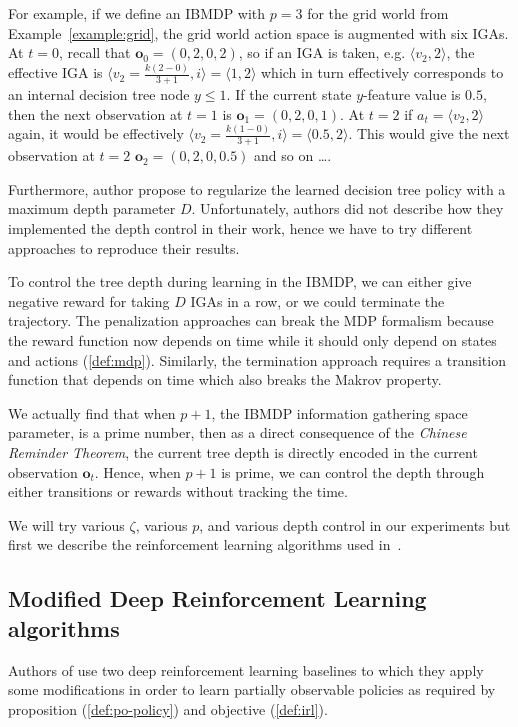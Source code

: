 For example, if we define an IBMDP with $p=3$ for the grid world from Example~\ref{example:grid}, the grid world action space is augmented with six IGAs. 
At $t=0$, recall that $\boldsymbol{o}_0=(0, 2, 0, 2)$, so if an IGA is taken, e.g. $\langle v_2, 2 \rangle$, the effective IGA is $\langle v_2=\frac{k(2-0)}{3+1}, i \rangle = \langle 1, 2 \rangle$ which in turn effectively corresponds to an internal decision tree node $y \leq 1$.
If the current state $y$-feature value is $0.5$, then the next observation at $t=1$ is $\boldsymbol{o}_1=(0, 2, 0, 1)$. At $t=2$ if $a_t=\langle v_2, 2 \rangle$ again, it would be effectively $\langle v_2=\frac{k(1-0)}{3+1}, i \rangle = \langle 0.5, 2 \rangle$. 
This would give the next observation at $t=2$ $\boldsymbol{o}_2=(0, 2, 0, 0.5)$ and so on \dots. 

Furthermore, author propose to regularize the learned decision tree policy with a maximum depth parameter $D$.
Unfortunately, authors did not describe how they implemented the depth control in their work, hence we have to try different approaches to reproduce their results.

To control the tree depth during learning in the IBMDP, we can either give negative reward for taking $D$ IGAs in a row, or we could terminate the trajectory. 
The penalization approaches can break the MDP formalism because the reward function now depends on time while it should only depend on states and actions (\ref{def:mdp}).
Similarly, the termination approach requires a transition function that depends on time which also breaks the Makrov property.

We actually find that when $p+1$, the IBMDP information gathering space parameter, is a prime number, then as a direct consequence of the \textit{Chinese Reminder Theorem}, the current tree depth is directly encoded in the current observation $\boldsymbol{o}_t$. 
Hence, when $p+1$ is prime, we can control the depth through either transitions or rewards without tracking the time.

We will try various $\zeta$, various $p$, and various depth control in our experiments but first we describe the reinforcement learning algorithms used in~\cite{topin2021iterative}.

\subsection{Modified Deep Reinforcement Learning algorithms}
Authors of \cite{topin2021iterative} use two deep reinforcement learning baselines to which they apply some modifications in order to learn partially observable policies as required by proposition (\ref{def:po-policy}) and objective (\ref{def:irl}).

